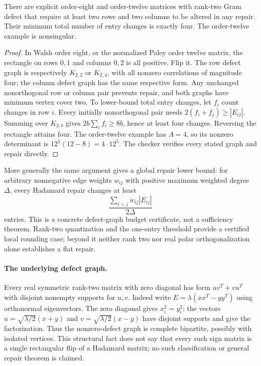 \begin{proposition}
\label{prop:spectral-nontrivial-repair}
There are explicit order-eight and order-twelve matrices with rank-two
Gram defect that require at least two rows and two columns to be altered
in any repair. Their minimum total number of entry changes is exactly
four. The order-twelve example is nonsingular.
\end{proposition}
\begin{proof}
In Walsh order eight, or the normalized Paley order twelve matrix, the
rectangle on rows $0,1$ and columns $0,2$ is all positive. Flip it.
The row defect graph is respectively $K_{2,2}$ or $K_{2,4}$, with all
nonzero correlations of magnitude four; the column defect graph has
the same respective form. Any unchanged nonorthogonal row or column
pair prevents repair, and both graphs have minimum vertex cover two.
To lower-bound total entry changes, let $f_i$ count changes in row $i$.
Every initially nonorthogonal pair needs
$2(f_i+f_j)\ge|E_{ij}|$. Summing over $K_{2,b}$ gives
$2b\sum_i f_i\ge 8b$, hence at least four changes. Reversing the
rectangle attains four. The order-twelve example has $A=4$, so its
nonzero determinant is $12^5(12-8)=4\cdot12^5$.
The checker verifies every stated graph and repair directly.
\end{proof}

More generally the same argument gives a global repair lower bound:
for arbitrary nonnegative edge weights $w_{ij}$ with positive maximum
weighted degree $\Delta$, every Hadamard repair changes at least
\[
 \frac{\sum_{i<j}w_{ij}|E_{ij}|}{2\Delta}
\]
entries. This is a concrete defect-graph budget certificate, not a
sufficiency theorem. Rank-two quantization and the one-entry threshold
provide a certified local rounding case; beyond it neither rank two nor
real polar orthogonalization alone establishes a flat repair.

\paragraph{The underlying defect graph.}
Every real symmetric rank-two matrix with zero diagonal has form
$uv^T+vu^T$ with disjoint nonempty supports for $u,v$. Indeed write
$E=\lambda(xx^T-yy^T)$ using orthonormal eigenvectors. The zero diagonal
gives $x_i^2=y_i^2$; the vectors
$u=\sqrt{\lambda/2}(x+y)$ and
$v=\sqrt{\lambda/2}(x-y)$ have disjoint supports and give the factorization.
Thus the nonzero-defect graph is complete bipartite, possibly with isolated
vertices. This structural fact does not say that every such sign matrix
is a single rectangular flip of a Hadamard matrix; no such classification
or general repair theorem is claimed.
